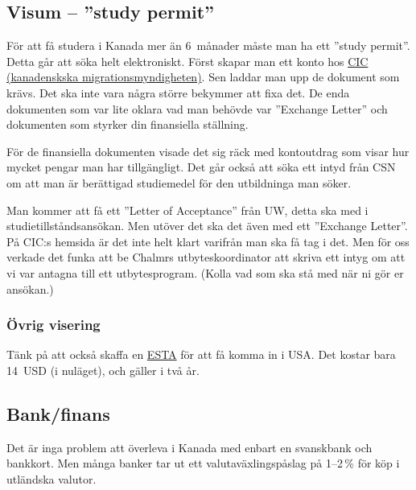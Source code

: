 \documentclass[11pt,a4paper, english, swedish]{article}
\begin{document}
\subsection{Visum -- ''study permit''}
För att få studera i Kanada mer än 6~månader måste man ha ett ''study
permit''. Detta går att söka helt elektroniskt. Först skapar man ett
konto hos
\href{http://www.cic.gc.ca/english/information/applications/student.asp}{CIC
(kanadenskska migrationsmyndigheten)}. Sen laddar man upp de dokument
som krävs. Det ska inte vara några större bekymmer att fixa det.
De enda dokumenten som var lite oklara vad man behövde var ''Exchange
Letter'' och dokumenten som styrker din finansiella ställning.

För de finansiella dokumenten visade det sig räck med kontoutdrag som
visar hur mycket pengar man har tillgängligt. Det går också att söka
ett intyd från CSN om att man är berättigad studiemedel för den
utbildninga man söker. 

Man kommer att få ett ''Letter of Acceptance'' från UW, detta ska med
i studietillståndsansökan. Men utöver det ska det även med ett
''Exchange Letter''. På CIC:s hemsida är det inte helt klart varifrån
man ska få tag i det. Men för oss verkade det funka att be Chalmrs
utbyteskoordinator\footnotemark{} att skriva ett intyg om att vi var
antagna till ett utbytesprogram. (Kolla vad som ska stå med när ni gör
er ansökan.) 

\subsubsection{Övrig visering}
Tänk på att också skaffa en
\href{http://www.esta.us/sweden.html}{ESTA} för att få komma in i
USA. Det kostar bara 14~USD (i nuläget), och gäller i två år.


\subsection{Bank/finans}
Det är inga problem att överleva i Kanada med enbart en svanskbank och
bankkort. Men många banker tar ut ett valutaväxlingspåslag på 1--2\,\%
för köp i utländska valutor. 
\end{document}

